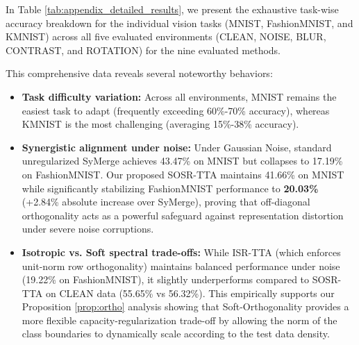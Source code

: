 \documentclass{article}
\theoremstyle{plain}
\theoremstyle{definition}
\theoremstyle{remark}
\begin{document}
In Table \ref{tab:appendix_detailed_results}, we present the exhaustive task-wise accuracy breakdown for the individual vision tasks (MNIST, FashionMNIST, and KMNIST) across all five evaluated environments (CLEAN, NOISE, BLUR, CONTRAST, and ROTATION) for the nine evaluated methods. 

This comprehensive data reveals several noteworthy behaviors:
\begin{itemize}
  \item \textbf{Task difficulty variation:} Across all environments, MNIST remains the easiest task to adapt (frequently exceeding 60\%-70\% accuracy), whereas KMNIST is the most challenging (averaging 15\%-38\% accuracy).
  \item \textbf{Synergistic alignment under noise:} Under Gaussian Noise, standard unregularized SyMerge achieves 43.47\% on MNIST but collapses to 17.19\% on FashionMNIST. Our proposed SOSR-TTA maintains 41.66\% on MNIST while significantly stabilizing FashionMNIST performance to \textbf{20.03\%} (+2.84\% absolute increase over SyMerge), proving that off-diagonal orthogonality acts as a powerful safeguard against representation distortion under severe noise corruptions.
  \item \textbf{Isotropic vs. Soft spectral trade-offs:} While ISR-TTA (which enforces unit-norm row orthogonality) maintains balanced performance under noise (19.22\% on FashionMNIST), it slightly underperforms compared to SOSR-TTA on CLEAN data (55.65\% vs 56.32\%). This empirically supports our Proposition \ref{prop:ortho} analysis showing that Soft-Orthogonality provides a more flexible capacity-regularization trade-off by allowing the norm of the class boundaries to dynamically scale according to the test data density.
\end{itemize}
\end{document}
